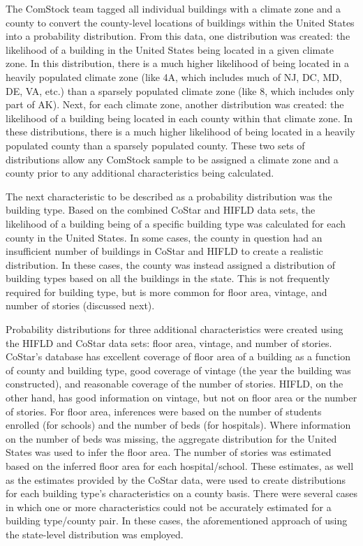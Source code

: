 The ComStock team tagged all individual buildings with a climate zone and a county to convert the county-level locations of buildings within the United States into a probability distribution. From this data, one distribution was created: the likelihood of a building in the United States being located in a given climate zone. In this distribution, there is a much higher likelihood of being located in a heavily populated climate zone (like 4A, which includes much of NJ, DC, MD, DE, VA, etc.) than a sparsely populated climate zone (like 8, which includes only part of AK). Next, for each climate zone, another distribution was created: the likelihood of a building being located in each county within that climate zone. In these distributions, there is a much higher likelihood of being located in a heavily populated county than a sparsely populated county. These two sets of distributions allow any ComStock sample to be assigned a climate zone and a county prior to any additional characteristics being calculated.

The next characteristic to be described as a probability distribution was the building type. Based on the combined CoStar and HIFLD data sets, the likelihood of a building being of a specific building type was calculated for each county in the United States. In some cases, the county in question had an insufficient number of buildings in CoStar and HIFLD to create a realistic distribution. In these cases, the county was instead assigned a distribution of building types based on all the buildings in the state. This is not frequently required for building type, but is more common for floor area, vintage, and number of stories (discussed next).

Probability distributions for three additional characteristics were created using the HIFLD and CoStar data sets: floor area, vintage, and number of stories. CoStar's database has excellent coverage of floor area of a building as a function of county and building type, good coverage of vintage (the year the building was constructed), and reasonable coverage of the number of stories. HIFLD, on the other hand, has good information on vintage, but not on floor area or the number of stories. For floor area, inferences were based on the number of students enrolled (for schools) and the number of beds (for hospitals). Where information on the number of beds was missing, the aggregate distribution for the United States was used to infer the floor area. The number of stories was estimated based on the inferred floor area for each hospital/school. These estimates, as well as the estimates provided by the CoStar data, were used to create distributions for each building type's characteristics on a county basis. There were several cases in which one or more characteristics could not be accurately estimated for a building type/county pair. In these cases, the aforementioned approach of using the state-level distribution was employed.

